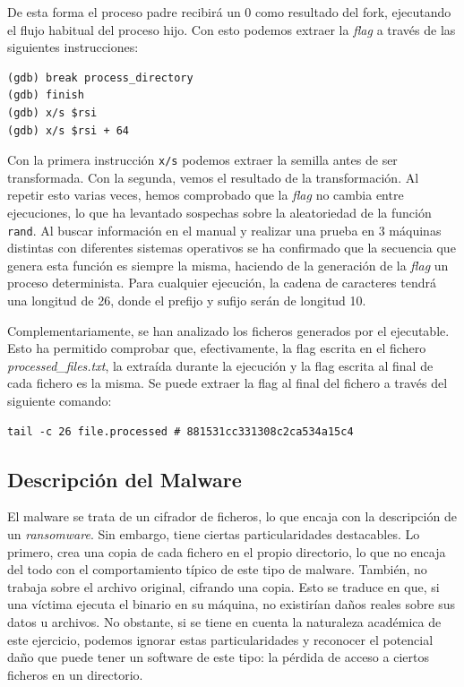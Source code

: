 \documentclass[]{article}
\begin{document}
De esta forma el proceso padre recibirá un 0 como resultado del fork,
ejecutando el flujo habitual del proceso hijo. Con esto podemos extraer la
\textit{flag} a través de las siguientes instrucciones:

\begin{lstlisting}[caption=Instrucciones en gdb para extraer la flag]
(gdb) break process_directory
(gdb) finish
(gdb) x/s $rsi
(gdb) x/s $rsi + 64
\end{lstlisting}

Con la primera instrucción \texttt{x/s} podemos extraer la semilla antes de ser
transformada. Con la segunda, vemos el resultado de la transformación. Al
repetir esto varias veces, hemos comprobado que la \textit{flag} no cambia
entre ejecuciones, lo que ha levantado sospechas sobre la aleatoriedad de la
función \texttt{rand}. Al buscar información en el manual y realizar una prueba
en 3 máquinas distintas con diferentes sistemas operativos se ha confirmado que
la secuencia que genera esta función es siempre la misma, haciendo de la
generación de la \textit{flag} un proceso determinista. Para cualquier ejecución, la
cadena de caracteres tendrá una longitud de 26, donde el prefijo y sufijo serán
de longitud 10.

Complementariamente, se han analizado los ficheros generados por el ejecutable.
Esto ha permitido comprobar que, efectivamente, la flag escrita en el fichero
\textit{processed\_files.txt}, la extraída durante la ejecución y la flag
escrita al final de cada fichero es la misma. Se puede extraer la flag al final
del fichero a través del siguiente comando:

\begin{lstlisting}[caption=Obtención de la flag transformada concatenada al final del fichero]
tail -c 26 file.processed # 881531cc331308c2ca534a15c4
\end{lstlisting}

\subsection{Descripción del Malware}
\label{malware1}

El malware se trata de un cifrador de ficheros, lo que encaja con la
descripción de un \textit{ransomware}. Sin embargo, tiene ciertas
particularidades destacables. Lo primero, crea una copia de cada fichero en el
propio directorio, lo que no encaja del todo con el comportamiento típico de
este tipo de malware. También, no trabaja sobre el archivo original, cifrando
una copia. Esto se traduce en que, si una víctima ejecuta el binario en su
máquina, no existirían daños reales sobre sus datos u archivos. No obstante, si
se tiene en cuenta la naturaleza académica de este ejercicio, podemos ignorar
estas particularidades y reconocer el potencial daño que puede tener un
software de este tipo: la pérdida de acceso a ciertos ficheros en un directorio.
\end{document}
